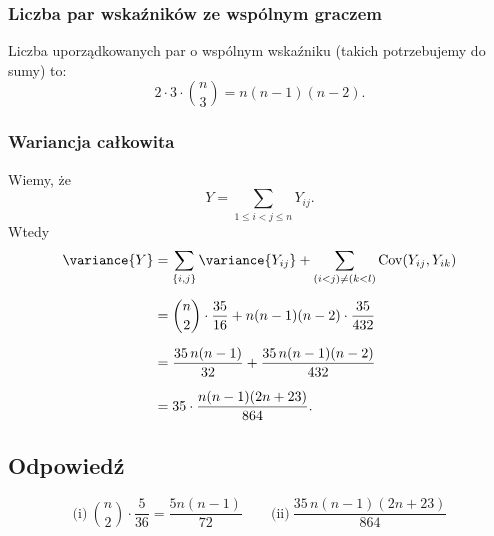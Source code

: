 \subsubsection*{Liczba par wskaźników ze wspólnym graczem}
Liczba uporządkowanych par o wspólnym wskaźniku (takich potrzebujemy do sumy) to: \\
\[
	2 \cdot 3 \cdot \binom{n}{3} = n(n-1)(n-2).
\]

\subsubsection*{Wariancja całkowita}
Wiemy, że
\[
	Y = \sum_{1 \le i < j \le n} Y_{ij}.
\]
Wtedy
\[
	\begin{aligned}
		\variance{Y}
		 & = \sum_{\{i,j\}} \variance{Y_{ij}}
		+ \sum_{\substack{(i < j) \neq (k < l)\\}}
		\operatorname{Cov}(Y_{ij}, Y_{ik})                                       \\[6pt]
		 & = \binom{n}{2} \cdot \frac{35}{16} + n(n-1)(n-2) \cdot \frac{35}{432} \\[6pt]
		 & = \frac{35\,n(n-1)}{32} + \frac{35\,n(n-1)(n-2)}{432}                 \\[6pt]
		 & = 35 \cdot \frac{n(n-1)(2n+23)}{864}.
	\end{aligned}
\]



\subsection*{Odpowiedź}
\[
	\boxed{
		\text{(i)}\ \binom{n}{2} \cdot \frac{5}{36} = \frac{5n(n-1)}{72}
		\qquad
		\text{(ii)}\ \frac{35\,n(n-1)(2n+23)}{864}
	}
\]
